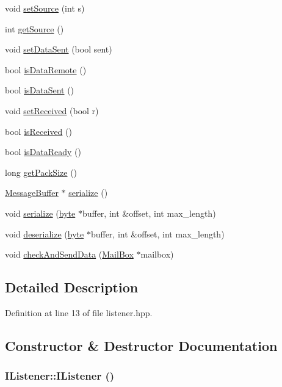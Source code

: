 \begin{DoxyCompactItemize}
\item 
void \hyperlink{class_i_listener_af65b43016d32d8437fc5dcc4ed11fef4}{setSource} (int s)
\item 
int \hyperlink{class_i_listener_a52a8aa5ce8929ad9eae2a7c9c7cce9ba}{getSource} ()
\item 
void \hyperlink{class_i_listener_a54c8d2e23951e95dbb6eae79b6c9d975}{setDataSent} (bool sent)
\item 
bool \hyperlink{class_i_listener_af8508f7394c3a5171d283f94c117f806}{isDataRemote} ()
\item 
bool \hyperlink{class_i_listener_af0cb8b56c305486c399dc60427864ef4}{isDataSent} ()
\item 
void \hyperlink{class_i_listener_a48b905974e451f8ab3998dd212d06af1}{setReceived} (bool r)
\item 
bool \hyperlink{class_i_listener_aef5dea3b4b1ca6d3b14b3f5340514c0a}{isReceived} ()
\item 
bool \hyperlink{class_i_listener_a2a9973fb9b26f21ee034d4ba0349e541}{isDataReady} ()
\item 
long \hyperlink{class_i_listener_a8a3f4a3f3c27cd671415192b99b10a96}{getPackSize} ()
\item 
\hyperlink{struct_message_buffer}{MessageBuffer} $\ast$ \hyperlink{class_i_listener_a4e270e6c78f576bcca1dbccda5305ac3}{serialize} ()
\item 
void \hyperlink{class_i_listener_aab9d4cfe83a94b1ca4480e8d186ff112}{serialize} (\hyperlink{engine_8hpp_a0c8186d9b9b7880309c27230bbb5e69d}{byte} $\ast$buffer, int \&offset, int max\_\-length)
\item 
void \hyperlink{class_i_listener_a893f2f48814ce66437c6f2add51c8b8d}{deserialize} (\hyperlink{engine_8hpp_a0c8186d9b9b7880309c27230bbb5e69d}{byte} $\ast$buffer, int \&offset, int max\_\-length)
\item 
void \hyperlink{class_i_listener_a092fa85ce870bd169930cffce12bc87b}{checkAndSendData} (\hyperlink{class_mail_box}{MailBox} $\ast$mailbox)
\end{DoxyCompactItemize}


\subsection{Detailed Description}


Definition at line 13 of file listener.hpp.

\subsection{Constructor \& Destructor Documentation}
\hypertarget{class_i_listener_a580e07e9510e6566f2585942f40b16ba}{
\subsubsection[{IListener}]{\setlength{\rightskip}{0pt plus 5cm}IListener::IListener ()}}
\label{class_i_listener_a580e07e9510e6566f2585942f40b16ba}


